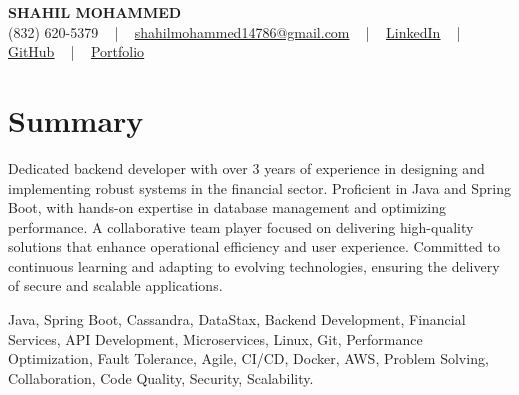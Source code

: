 \documentclass[letterpaper,10pt]{article}
\begin{document}
\begin{center}
    {\fontsize{14pt}{12pt}\selectfont \textbf{\MakeUppercase{Shahil Mohammed}}}\\ \vspace{2pt}
    \fontsize{10pt}{12pt}\selectfont (832) 620-5379 ~ | ~ \href{mailto:shahilmohammed14786@gmail.com}{shahilmohammed14786@gmail.com} ~ | ~  
    \href{https://www.linkedin.com/in/shahil-mohammed-9652931a1/}{\color{blue}\underline{LinkedIn}}  ~ | ~ 
    \href{https://github.com/freakbeast14}{\color{blue}\underline{GitHub}} ~ | ~ 
    \href{https://shahil-mohammed.netlify.app/}{\color{blue}\underline{Portfolio}}
    \vspace{-8pt}
\end{center}

\section{Summary}
\vspace{-2pt}\fontsize{8pt}{9pt}\selectfont
Dedicated backend developer with over 3 years of experience in designing and implementing robust systems in the financial sector. Proficient in Java and Spring Boot, with hands-on expertise in database management and optimizing performance. A collaborative team player focused on delivering high-quality solutions that enhance operational efficiency and user experience. Committed to continuous learning and adapting to evolving technologies, ensuring the delivery of secure and scalable applications.
 \vspace{-5pt}
 
{\fontsize{1pt}{1pt}\selectfont\color{white}
Java, Spring Boot, Cassandra, DataStax, Backend Development, Financial Services, API Development, Microservices, Linux, Git, Performance Optimization, Fault Tolerance, Agile, CI/CD, Docker, AWS, Problem Solving, Collaboration, Code Quality, Security, Scalability.
}
\vspace{-8pt}

\vspace{-2pt}
\end{document}
